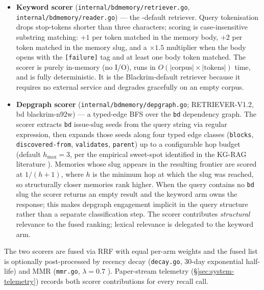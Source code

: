 \begin{itemize}[leftmargin=*]
  \item \textbf{Keyword scorer} (\texttt{internal/bdmemory/retriever.go},
        \texttt{internal/bdmemory/reader.go}) --- the \blackrim-default
        retriever.  Query tokenisation drops stop-tokens shorter than
        three characters; scoring is case-insensitive substring
        matching: $+1$ per token matched in the memory body, $+2$ per
        token matched in the memory slug, and a $\times 1.5$ multiplier
        when the body opens with the \texttt{[failure]} tag and at least
        one body token matched.  The scorer is purely in-memory (no
        I/O), runs in $O(|\text{corpus}| \times |\text{tokens}|)$ time,
        and is fully deterministic.  It is the Blackrim-default retriever
        because it requires no external service and degrades gracefully
        on an empty corpus.

  \item \textbf{Depgraph scorer} (\texttt{internal/bdmemory/depgraph.go};
        RETRIEVER-V1.2, bd blackrim-n92w) --- a typed-edge BFS over the
        \texttt{bd} dependency graph.  The scorer extracts \texttt{bd}
        issue-slug seeds from the query string via regular expression,
        then expands those seeds along four typed edge classes
        (\texttt{blocks}, \texttt{discovered-from}, \texttt{validates},
        \texttt{parent}) up to a configurable hop budget (default
        $h_{\max} = 3$, per the empirical sweet-spot identified in the
        KG-RAG literature \cite{blackrim_ijl0_landscape}).  Memories
        whose slug appears in the resulting frontier are scored at
        $1 / (h + 1)$, where $h$ is the minimum hop at which the slug
        was reached, so structurally closer memories rank higher.  When
        the query contains no \texttt{bd} slug the scorer returns an
        empty result and the keyword arm owns the response; this makes
        depgraph engagement implicit in the query structure rather than
        a separate classification step.  The scorer contributes
        \emph{structural} relevance to the fused ranking; lexical
        relevance is delegated to the keyword arm.
\end{itemize}

The two scorers are fused via RRF with equal per-arm weights and the
fused list is optionally post-processed by recency decay
(\texttt{decay.go}, 30-day exponential half-life) and MMR
(\texttt{mmr.go}, $\lambda = 0.7$ \cite{carbonell1998mmr}).
Paper-stream telemetry (\S\ref{sec:system-telemetry}) records both
scorer contributions for every recall call.


